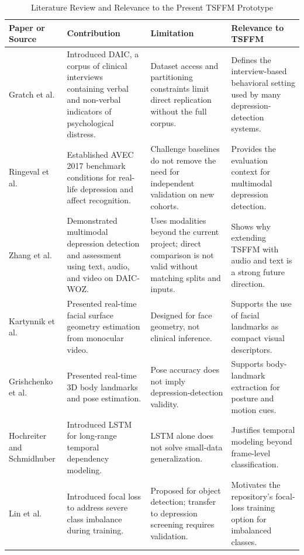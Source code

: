 \documentclass[conference]{IEEEtran}
\begin{document}
\begin{table}[t]
\caption{Literature Review and Relevance to the Present TSFFM Prototype}
\label{tab:litreview}
\centering
\begin{tabularx}{\textwidth}{p{}Y Y Y}
\toprule
\textbf{Paper or Source} & \textbf{Contribution} & \textbf{Limitation} & \textbf{Relevance to TSFFM} \\
\midrule
Gratch et al. \cite{gratch_daic} & Introduced DAIC, a corpus of clinical interviews containing verbal and non-verbal indicators of psychological distress. & Dataset access and partitioning constraints limit direct replication without the full corpus. & Defines the interview-based behavioral setting used by many depression-detection systems. \\
Ringeval et al. \cite{ringeval_avec2017} & Established AVEC 2017 benchmark conditions for real-life depression and affect recognition. & Challenge baselines do not remove the need for independent validation on new cohorts. & Provides the evaluation context for multimodal depression detection. \\
Zhang et al. \cite{zhang_multimodal} & Demonstrated multimodal depression detection and assessment using text, audio, and video on DAIC-WOZ. & Uses modalities beyond the current project; direct comparison is not valid without matching splits and inputs. & Shows why extending TSFFM with audio and text is a strong future direction. \\
Kartynnik et al. \cite{kartynnik_facemesh} & Presented real-time facial surface geometry estimation from monocular video. & Designed for face geometry, not clinical inference. & Supports the use of facial landmarks as compact visual descriptors. \\
Grishchenko et al. \cite{grishchenko_blazepose} & Presented real-time 3D body landmarks and pose estimation. & Pose accuracy does not imply depression-detection validity. & Supports body-landmark extraction for posture and motion cues. \\
Hochreiter and Schmidhuber \cite{hochreiter_lstm} & Introduced LSTM for long-range temporal dependency modeling. & LSTM alone does not solve small-data generalization. & Justifies temporal modeling beyond frame-level classification. \\
Lin et al. \cite{lin_focal} & Introduced focal loss to address severe class imbalance during training. & Proposed for object detection; transfer to depression screening requires validation. & Motivates the repository's focal-loss training option for imbalanced classes. \\
\bottomrule
\end{tabularx}
\end{table}
\end{document}
